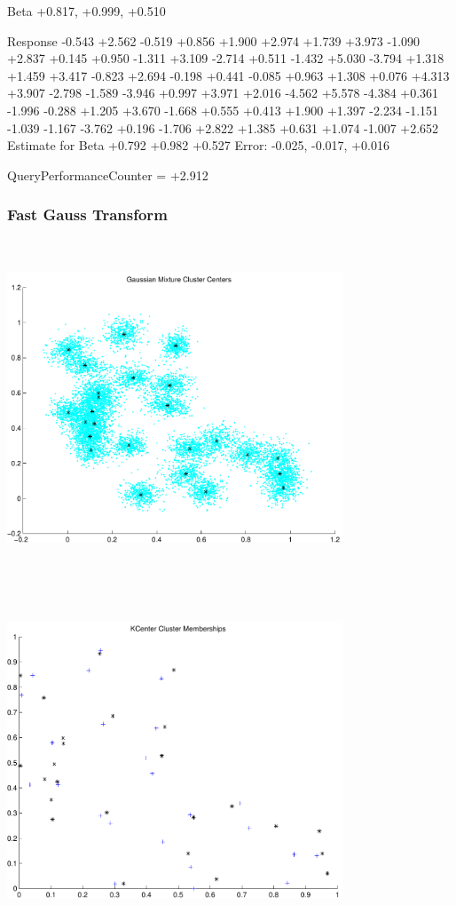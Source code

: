 \documentclass[9pt]{article}
\theoremstyle{plain}
\theoremstyle{definition}
\theoremstyle{remark}
\numberwithin{equation}{section}
\begin{document}
Beta
+0.817, +0.999, +0.510

Response
-0.543
+2.562
-0.519
+0.856
+1.900
+2.974
+1.739
+3.973
-1.090
+2.837
+0.145
+0.950
-1.311
+3.109
-2.714
+0.511
-1.432
+5.030
-3.794
+1.318
+1.459
+3.417
-0.823
+2.694
-0.198
+0.441
-0.085
+0.963
+1.308
+0.076
+4.313
+3.907
-2.798
-1.589
-3.946
+0.997
+3.971
+2.016
-4.562
+5.578
-4.384
+0.361
-1.996
-0.288
+1.205
+3.670
-1.668
+0.555
+0.413
+1.900
+1.397
-2.234
-1.151
-1.039
-1.167
-3.762
+0.196
-1.706
+2.822
+1.385
+0.631
+1.074
-1.007
+2.652
Estimate for Beta
+0.792
+0.982
+0.527
Error:
-0.025, -0.017, +0.016


QueryPerformanceCounter  =  +2.912
\subsubsection{Fast Gauss Transform}
\includegraphics[width=10.0cm,height=10.0cm]{GaussianMixture_ClusterCenters25_Centers.pdf}

\includegraphics[width=10.0cm,height=10.0cm]{KCenterClusterMemberships_25_Centers.pdf}
\end{document}
